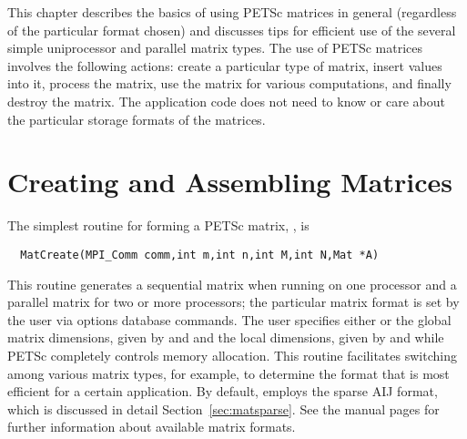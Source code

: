 This chapter describes the basics of using PETSc matrices in general
(regardless of the particular format chosen) and discusses tips for
efficient use of the several simple uniprocessor and parallel matrix
types.  The use of PETSc matrices involves the following actions:
create a particular type of matrix, insert values into it, process the
matrix, use the matrix for various computations, and finally destroy
the matrix.  The application code does not need to know or care about
the particular storage formats of the matrices.

\section{Creating and Assembling Matrices}
\label{sec:matcreate}

The simplest routine for forming a PETSc matrix, , is 
\begin{verbatim}
  MatCreate(MPI_Comm comm,int m,int n,int M,int N,Mat *A)
\end{verbatim}
This routine generates a sequential matrix when running on one
processor and a parallel matrix for two or more processors; the
particular matrix format is set by the user via options database
commands.  The user specifies either or the global matrix dimensions, given
by  and  and the local dimensions, given by  and 
 while PETSc completely controls memory allocation.  This routine
facilitates switching among various matrix types, for example, to
determine the format that is most efficient for a certain
application.  By default,  employs the sparse AIJ
format, which is discussed in detail Section~\ref{sec:matsparse}.  See
the manual pages for further information about available matrix formats.

